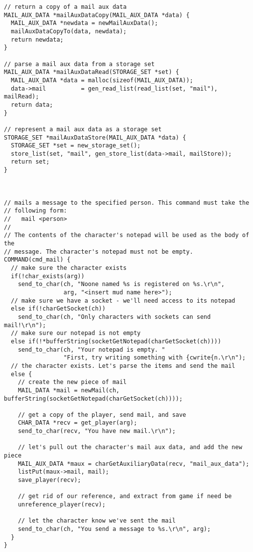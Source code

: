 \documentclass[12pt]{article}
\begin{document}
{\begin{verbatim}
// return a copy of a mail aux data
MAIL_AUX_DATA *mailAuxDataCopy(MAIL_AUX_DATA *data) {
  MAIL_AUX_DATA *newdata = newMailAuxData();
  mailAuxDataCopyTo(data, newdata);
  return newdata;
}

// parse a mail aux data from a storage set
MAIL_AUX_DATA *mailAuxDataRead(STORAGE_SET *set) {
  MAIL_AUX_DATA *data = malloc(sizeof(MAIL_AUX_DATA));
  data->mail          = gen_read_list(read_list(set, "mail"), mailRead);
  return data;
}

// represent a mail aux data as a storage set
STORAGE_SET *mailAuxDataStore(MAIL_AUX_DATA *data) {
  STORAGE_SET *set = new_storage_set();
  store_list(set, "mail", gen_store_list(data->mail, mailStore));
  return set;
}



// mails a message to the specified person. This command must take the 
// following form:
//   mail <person>
//
// The contents of the character's notepad will be used as the body of the
// message. The character's notepad must not be empty.
COMMAND(cmd_mail) {
  // make sure the character exists
  if(!char_exists(arg))
    send_to_char(ch, "Noone named %s is registered on %s.\r\n",
                 arg, "<insert mud name here>");
  // make sure we have a socket - we'll need access to its notepad
  else if(!charGetSocket(ch))
    send_to_char(ch, "Only characters with sockets can send mail!\r\n");
  // make sure our notepad is not empty
  else if(!*bufferString(socketGetNotepad(charGetSocket(ch))))
    send_to_char(ch, "Your notepad is empty. "
                 "First, try writing something with {cwrite{n.\r\n");
  // the character exists. Let's parse the items and send the mail
  else {
    // create the new piece of mail
    MAIL_DATA *mail = newMail(ch, bufferString(socketGetNotepad(charGetSocket(ch))));

    // get a copy of the player, send mail, and save
    CHAR_DATA *recv = get_player(arg);
    send_to_char(recv, "You have new mail.\r\n");
    
    // let's pull out the character's mail aux data, and add the new piece
    MAIL_AUX_DATA *maux = charGetAuxiliaryData(recv, "mail_aux_data");
    listPut(maux->mail, mail);
    save_player(recv);
      
    // get rid of our reference, and extract from game if need be
    unreference_player(recv);      

    // let the character know we've sent the mail
    send_to_char(ch, "You send a message to %s.\r\n", arg);
  }
}



\end{verbatim}}
\end{document}
